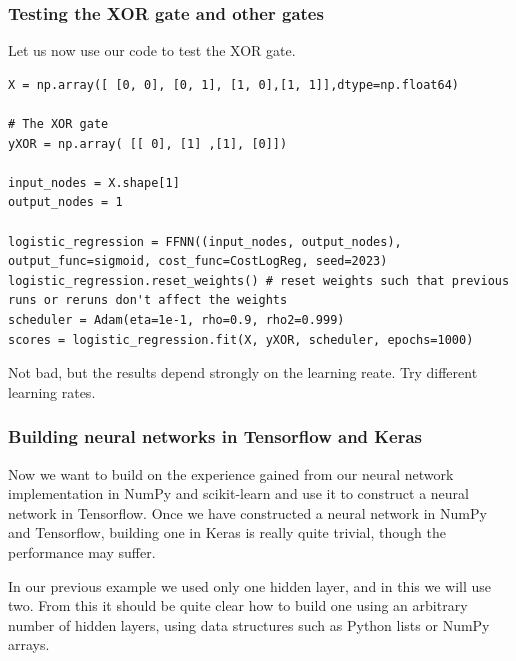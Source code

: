 \documentclass{beamer}
\begin{document}
\begin{frame}
\frametitle{Testing the XOR gate and other gates}

Let us now use our code to test the XOR gate.














\begin{verbatim}
X = np.array([ [0, 0], [0, 1], [1, 0],[1, 1]],dtype=np.float64)

# The XOR gate
yXOR = np.array( [[ 0], [1] ,[1], [0]])

input_nodes = X.shape[1]
output_nodes = 1

logistic_regression = FFNN((input_nodes, output_nodes), output_func=sigmoid, cost_func=CostLogReg, seed=2023)
logistic_regression.reset_weights() # reset weights such that previous runs or reruns don't affect the weights
scheduler = Adam(eta=1e-1, rho=0.9, rho2=0.999)
scores = logistic_regression.fit(X, yXOR, scheduler, epochs=1000)

\end{verbatim}

Not bad, but the results depend strongly on the learning reate. Try different learning rates.
\end{frame}

\begin{frame}
\frametitle{Building neural networks in Tensorflow and Keras}

Now we want  to build on the experience gained from our neural network implementation in NumPy and scikit-learn
and use it to construct a neural network in Tensorflow. Once we have constructed a neural network in NumPy
and Tensorflow, building one in Keras is really quite trivial, though the performance may suffer.  

In our previous example we used only one hidden layer, and in this we will use two. From this it should be quite
clear how to build one using an arbitrary number of hidden layers, using data structures such as Python lists or
NumPy arrays.
\end{frame}
\end{document}
